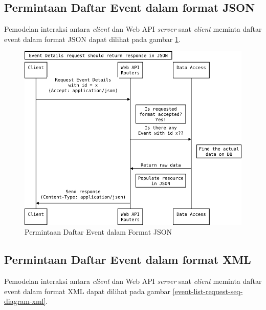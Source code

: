 \documentclass[a4paper, 12pt, oneside]{report}
\begin{document}
\newpage

\subsection{Permintaan Daftar Event dalam format JSON}

\onehalfspacing Pemodelan interaksi antara \textit{client} dan Web API \textit{server} saat \textit{client} meminta daftar event dalam format JSON dapat dilihat pada gambar \ref{event-list-request-seq-diagram-json}.

\begin{figure}[htp]
\centering
\includegraphics[scale=0.60]{images/event-details-request-seq-diagram-json.png}
\caption{Permintaan Daftar Event dalam Format JSON}
\label{event-list-request-seq-diagram-json}
\end{figure}

\newpage

\subsection{Permintaan Daftar Event dalam format XML}

\onehalfspacing Pemodelan interaksi antara \textit{client} dan Web API \textit{server} saat \textit{client} meminta daftar event dalam format XML dapat dilihat pada gambar \ref{event-list-request-seq-diagram-xml}.
\end{document}
